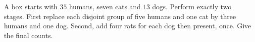 A box starts with $35$ humans, seven cats and $13$ dogs. Perform exactly two stages. First replace each disjoint group of five humans and one cat by three humans and one dog. Second, add four rats for each dog then present, once. Give the final counts.
